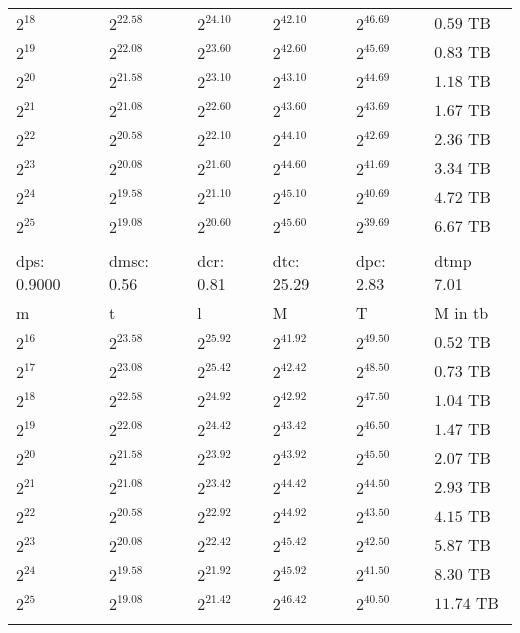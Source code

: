 \documentclass{article}
\begin{document}
\begin{tabular}{llllll}
$2^{18}$ & $2^{22.58}$ & $2^{24.10}$ & $2^{42.10}$ & $2^{46.69}$ & $0.59$ TB \\
$2^{19}$ & $2^{22.08}$ & $2^{23.60}$ & $2^{42.60}$ & $2^{45.69}$ & $0.83$ TB \\
$2^{20}$ & $2^{21.58}$ & $2^{23.10}$ & $2^{43.10}$ & $2^{44.69}$ & $1.18$ TB \\
$2^{21}$ & $2^{21.08}$ & $2^{22.60}$ & $2^{43.60}$ & $2^{43.69}$ & $1.67$ TB \\
$2^{22}$ & $2^{20.58}$ & $2^{22.10}$ & $2^{44.10}$ & $2^{42.69}$ & $2.36$ TB \\
$2^{23}$ & $2^{20.08}$ & $2^{21.60}$ & $2^{44.60}$ & $2^{41.69}$ & $3.34$ TB \\
$2^{24}$ & $2^{19.58}$ & $2^{21.10}$ & $2^{45.10}$ & $2^{40.69}$ & $4.72$ TB \\
$2^{25}$ & $2^{19.08}$ & $2^{20.60}$ & $2^{45.60}$ & $2^{39.69}$ & $6.67$ TB \\
 &  &  &  &  &  \\
dps: 0.9000 & dmsc: 0.56 & dcr: 0.81 & dtc: 25.29 & dpc: 2.83 & dtmp 7.01 \\
m & t & l & M & T & M in tb \\
$2^{16}$ & $2^{23.58}$ & $2^{25.92}$ & $2^{41.92}$ & $2^{49.50}$ & $0.52$ TB \\
$2^{17}$ & $2^{23.08}$ & $2^{25.42}$ & $2^{42.42}$ & $2^{48.50}$ & $0.73$ TB \\
$2^{18}$ & $2^{22.58}$ & $2^{24.92}$ & $2^{42.92}$ & $2^{47.50}$ & $1.04$ TB \\
$2^{19}$ & $2^{22.08}$ & $2^{24.42}$ & $2^{43.42}$ & $2^{46.50}$ & $1.47$ TB \\
$2^{20}$ & $2^{21.58}$ & $2^{23.92}$ & $2^{43.92}$ & $2^{45.50}$ & $2.07$ TB \\
$2^{21}$ & $2^{21.08}$ & $2^{23.42}$ & $2^{44.42}$ & $2^{44.50}$ & $2.93$ TB \\
$2^{22}$ & $2^{20.58}$ & $2^{22.92}$ & $2^{44.92}$ & $2^{43.50}$ & $4.15$ TB \\
$2^{23}$ & $2^{20.08}$ & $2^{22.42}$ & $2^{45.42}$ & $2^{42.50}$ & $5.87$ TB \\
$2^{24}$ & $2^{19.58}$ & $2^{21.92}$ & $2^{45.92}$ & $2^{41.50}$ & $8.30$ TB \\
$2^{25}$ & $2^{19.08}$ & $2^{21.42}$ & $2^{46.42}$ & $2^{40.50}$ & $11.74$ TB \\
 &  &  &  &  &  \\
\end{tabular}
\end{document}
